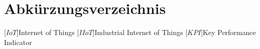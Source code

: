 \clearpage
\chapter*{Abkürzungsverzeichnis}\label{abkuerzungsverzeichnis}
\begin{acronym}[YTM]
\setlength{\itemsep}{-\parsep}

[$IoT$]{\hspace{1cm}Internet of Things}
[$IIoT$]{\hspace{1cm}Industrial Internet of Things}
[$KPI$]{\hspace{1cm}Key Performance Indicator}



\end{acronym}

